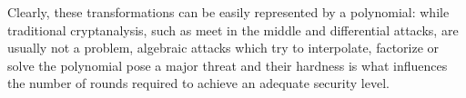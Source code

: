 \documentclass{article}
\begin{document}
Clearly, these transformations can be easily represented by a polynomial: while traditional 
cryptanalysis, such as meet in the middle and differential attacks, are usually not a problem, 
algebraic attacks which try to interpolate, factorize or solve the polynomial pose a major threat 
and their hardness is what influences the number of rounds required to achieve an adequate security
level. 

\section{}
\end{document}
